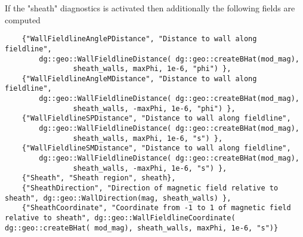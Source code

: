 If the "sheath" diagnostics is activated then additionally the following fields are computed
\begin{verbatim}
    {"WallFieldlineAnglePDistance", "Distance to wall along fieldline",
        dg::geo::WallFieldlineDistance( dg::geo::createBHat(mod_mag),
                sheath_walls, maxPhi, 1e-6, "phi") },
    {"WallFieldlineAngleMDistance", "Distance to wall along fieldline",
        dg::geo::WallFieldlineDistance( dg::geo::createBHat(mod_mag),
                sheath_walls, -maxPhi, 1e-6, "phi") },
    {"WallFieldlineSPDistance", "Distance to wall along fieldline",
        dg::geo::WallFieldlineDistance( dg::geo::createBHat(mod_mag),
                sheath_walls, maxPhi, 1e-6, "s") },
    {"WallFieldlineSMDistance", "Distance to wall along fieldline",
        dg::geo::WallFieldlineDistance( dg::geo::createBHat(mod_mag),
                sheath_walls, -maxPhi, 1e-6, "s") },
    {"Sheath", "Sheath region", sheath},
    {"SheathDirection", "Direction of magnetic field relative to sheath", dg::geo::WallDirection(mag, sheath_walls) },
    {"SheathCoordinate", "Coordinate from -1 to 1 of magnetic field relative to sheath", dg::geo::WallFieldlineCoordinate( dg::geo::createBHat( mod_mag), sheath_walls, maxPhi, 1e-6, "s")}
\end{verbatim}





